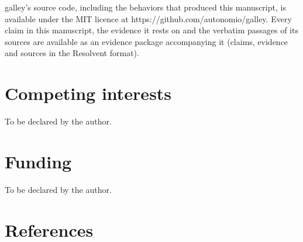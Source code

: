 \documentclass[
]{article}
\begin{document}
galley's source code, including the behaviors that produced this
manuscript, is available under the MIT licence at
https://github.com/autonomio/galley. Every claim in this manuscript, the
evidence it rests on and the verbatim passages of its sources are
available as an evidence package accompanying it (claims, evidence and
sources in the Resolvent format).

\section*{Competing interests}\label{competing-interests}

To be declared by the author.

\section*{Funding}\label{funding}

To be declared by the author.

\section*{References}\label{references}
\end{document}
